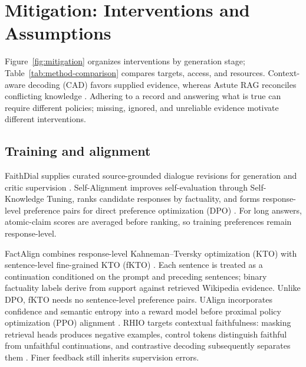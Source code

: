 \section{Mitigation: Interventions and Assumptions}\label{sec:mitigation}

Figure~\ref{fig:mitigation} organizes interventions by generation stage; Table~\ref{tab:method-comparison} compares targets, access, and resources. Context-aware decoding (CAD) favors supplied evidence, whereas Astute RAG reconciles conflicting knowledge \citep{shi-etal-2024-trusting,wang-etal-2025-astute}. Adhering to a record and answering what is true can require different policies; missing, ignored, and unreliable evidence motivate different interventions.




\subsection{Training and alignment}

FaithDial supplies curated source-grounded dialogue revisions for generation and critic supervision \citep{dziri-etal-2022-faithdial}. Self-Alignment improves self-evaluation through Self-Knowledge Tuning, ranks candidate responses by factuality, and forms response-level preference pairs for direct preference optimization (DPO) \citep{zhang-etal-2024-self}. For long answers, atomic-claim scores are averaged before ranking, so training preferences remain response-level.

FactAlign combines response-level Kahneman--Tversky optimization (KTO) with sentence-level fine-grained KTO (fKTO) \citep{huang-chen-2024-factalign}. Each sentence is treated as a continuation conditioned on the prompt and preceding sentences; binary factuality labels derive from support against retrieved Wikipedia evidence. Unlike DPO, fKTO needs no sentence-level preference pairs. UAlign incorporates confidence and semantic entropy into a reward model before proximal policy optimization (PPO) alignment \citep{xue-etal-2025-ualign}. RHIO targets contextual faithfulness: masking retrieval heads produces negative examples, control tokens distinguish faithful from unfaithful continuations, and contrastive decoding subsequently separates them \citep{huang-etal-2025-improving}. Finer feedback still inherits supervision errors.

